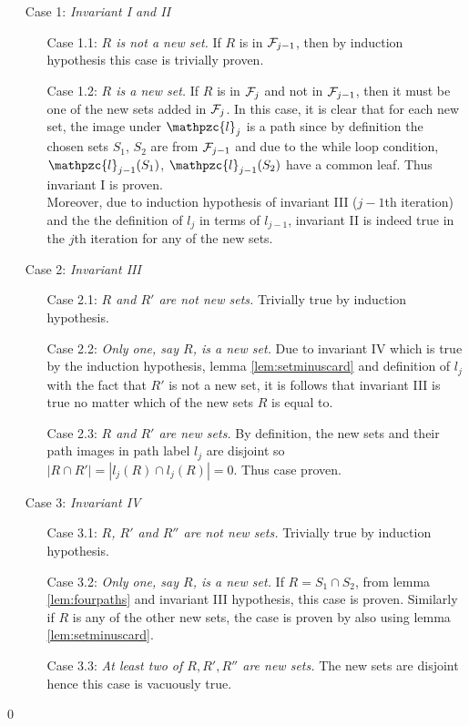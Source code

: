 \documentclass{fsttcs}
\def\cF{{\cal F}}
\def\cl{\mathpzc{l}}
\begin{document}
  \noindent
  \begin{enumerate}
  \item [Case 1:] {\em Invariant I and II} 
    \begin{enumerate}
    \item [Case 1.1:] {\em $R$ is not a new set.} If $R$ is in
      $\cF_{j-1}$, then by induction hypothesis this case is trivially
      proven.
    \item [Case 1.2:] {\em $R$ is a new set.} If $R$ is in $\cF_{j}$
      and not in $\cF_{j-1}$, then it must be one of the new sets
      added in $\cF_j$. In this case, it is clear that
      for each new set, the image under $\cl_j$ is a path since by definition the chosen
      sets $S_1$, $S_2$ are from $\cF_{j-1}$ and due to the while loop
      condition, $\cl_{j-1}(S_1)$, $\cl_{j-1}(S_2)$ have a common
      leaf. Thus invariant I is proven.\\
      Moreover, due to induction hypothesis of invariant III ($j-1$th
      iteration) and the  the definition of $l_j$ in terms of $l_{j-1}$, invariant II is indeed true in the $j$th
      iteration for any of the new sets.
   \end{enumerate}
  \item [Case 2:] {\em Invariant III}
    \begin{enumerate}
    \item [Case 2.1:] {\em $R$ and $R'$ are not new sets.} Trivially
      true by induction hypothesis.
    \item [Case 2.2:] {\em Only one, say $R$, is a new set.} Due to
  invariant IV which is true by the induction hypothesis, lemma \ref{lem:setminuscard} and
      definition of $l_j$ with the fact that $R'$ is not a new set, it is follows that invariant III is true no matter which of
      the new sets $R$ is equal to.
    \item [Case 2.3:] {\em $R$ and $R'$ are new sets.} By definition,
      the new sets and their path images in path label $l_j$ are
      disjoint so $|R \cap R'| = |l_j(R) \cap l_j(R)| = 0$. Thus case
      proven.
    \end{enumerate}
  \item [Case 3:] {\em Invariant IV}
    \begin{enumerate}
    \item [Case 3.1:] {\em $R$, $R'$ and $R''$ are not new sets.} Trivially
      true by induction hypothesis.
    \item [Case 3.2:] {\em Only one, say $R$, is a new set.}
      If $R = S_1 \cap S_2$,  from lemma \ref{lem:fourpaths} and
      invariant III hypothesis,  this case is proven. Similarly if $R$
      is any of the other new  sets, the case is proven by also using
      lemma  \ref{lem:setminuscard}.
    \item [Case 3.3:] {\em At least two of $R, R', R''$ are new sets.}
      The new sets are disjoint hence this case is vacuously true.
    \end{enumerate}
  \end{enumerate} 
\qed
\end{document}
